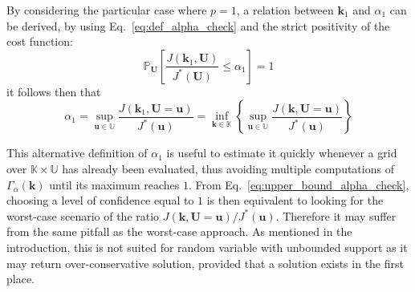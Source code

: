 \documentclass[preprint, 1p]{elsarticle}
\newcommand{\Prob}{\mathbb{P}}
\newcommand{\checka}{{\alpha}}
\newcommand{\checkk}{\mathbf{k}}
\newcommand{\checkkp}{{\mathbf{k}}_p}
\newcommand{\Kspace}{\mathbb{K}}
\newcommand{\Uspace}{\mathbb{U}}
\begin{document}


By considering the particular case where $p=1$, a relation between $\checkk_1$ and $\checka_1$ can be derived, by using Eq.~\eqref{eq:def_alpha_check} and the strict positivity of the cost function:
\begin{equation}
  \label{eq:def_alpha1}
  \Prob_{\mathbf{U}}\left[\frac{J(\mathbf{k}_1,\mathbf{U})}{ J^*(\mathbf{U}) } \leq \checka_1\right]=1
\end{equation}
it follows then that 
\begin{equation}
  \label{eq:upper_bound_alpha_check}
  \checka_1 = \sup_{\mathbf{u}\in\Uspace} \frac{J(\mathbf{k}_1,\mathbf{U}=\mathbf{u})}{J^*(\mathbf{u})} =  \inf_{\mathbf{k}\in\Kspace} \left\{ \sup_{\mathbf{u}\in\Uspace} \frac{J(\mathbf{k},\mathbf{U}=\mathbf{u})}{J^*(\mathbf{u})} \right\} 
\end{equation}

This alternative definition of $\checka_1$ is useful to estimate it quickly whenever a grid over $\mathbb{K}\times\mathbb{U}$ has already been evaluated, thus avoiding multiple computations of $\Gamma_{\alpha}(\mathbf{k})$ until its maximum reaches $1$. From Eq.~\eqref{eq:upper_bound_alpha_check}, choosing a level of confidence equal to $1$ is then equivalent to looking for the worst-case scenario of the ratio ${J(\mathbf{k},\mathbf{U}=\mathbf{u})/J^*(\mathbf{u})}$. Therefore it may suffer from the same pitfall as the worst-case approach. As mentioned in the introduction, this is not suited for random variable with unbounded support as it may return over-conservative solution, provided that a solution exists in the first place.
\end{document}
